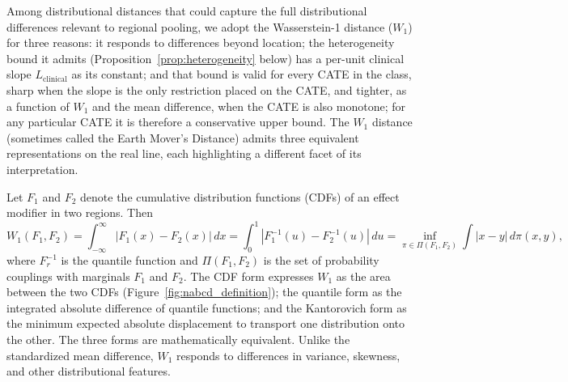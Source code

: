 \documentclass[AMA,Times1COL]{WileyNJDv5}
\begin{document}
Among distributional distances that could capture the full distributional differences relevant to regional pooling, we adopt the Wasserstein-1 distance ($W_1$) for three reasons: it responds to differences beyond location; the heterogeneity bound it admits (Proposition~\ref{prop:heterogeneity} below) has a per-unit clinical slope $L_{\text{clinical}}$ as its constant; and that bound is valid for every CATE in the class, sharp when the slope is the only restriction placed on the CATE, and tighter, as a function of $W_1$ and the mean difference, when the CATE is also monotone; for any particular CATE it is therefore a conservative upper bound. The $W_1$ distance (sometimes called the Earth Mover's Distance) admits three equivalent representations on the real line, each highlighting a different facet of its interpretation.\cite{villani2009,vallender1974}

Let $F_1$ and $F_2$ denote the cumulative distribution functions (CDFs) of an effect modifier in two regions. Then
\begin{equation}
W_1(F_1, F_2) = \int_{-\infty}^{\infty} |F_1(x) - F_2(x)| \, dx = \int_0^1 |F_1^{-1}(u) - F_2^{-1}(u)| \, du = \inf_{\pi \in \Pi(F_1, F_2)} \int |x - y| \, d\pi(x, y),
\label{eq:wasserstein}
\end{equation}
where $F_r^{-1}$ is the quantile function and $\Pi(F_1, F_2)$ is the set of probability couplings with marginals $F_1$ and $F_2$. The CDF form expresses $W_1$ as the area between the two CDFs (Figure~\ref{fig:nabcd_definition}); the quantile form as the integrated absolute difference of quantile functions; and the Kantorovich form as the minimum expected absolute displacement to transport one distribution onto the other. The three forms are mathematically equivalent.\cite{vallender1974} Unlike the standardized mean difference, $W_1$ responds to differences in variance, skewness, and other distributional features.\cite{panaretos2019}
\end{document}
